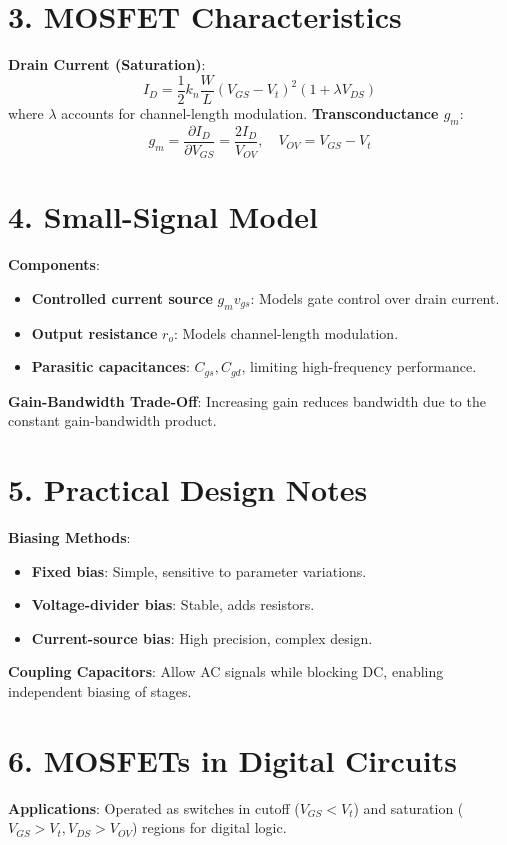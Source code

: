 \documentclass[10pt]{article}
\begin{document}
\begin{multicols}{2}
\section*{3. MOSFET Characteristics}
\textbf{Drain Current (Saturation)}:
\[
I_D = \frac{1}{2} k_n \frac{W}{L} (V_{GS} - V_t)^2 (1 + \lambda V_{DS})
\]
where \(\lambda\) accounts for channel-length modulation.  
\textbf{Transconductance \(g_m\)}:
\[
g_m = \frac{\partial I_D}{\partial V_{GS}} = \frac{2I_D}{V_{OV}}, \quad V_{OV} = V_{GS} - V_t
\]

\section*{4. Small-Signal Model}
\textbf{Components}:
\begin{itemize}[noitemsep]
    \item \textbf{Controlled current source} \(g_m v_{gs}\): Models gate control over drain current.
    \item \textbf{Output resistance} \(r_o\): Models channel-length modulation.
    \item \textbf{Parasitic capacitances}: \(C_{gs}, C_{gd}\), limiting high-frequency performance.
\end{itemize}
\textbf{Gain-Bandwidth Trade-Off}: Increasing gain reduces bandwidth due to the constant gain-bandwidth product.

\section*{5. Practical Design Notes}
\textbf{Biasing Methods}:
\begin{itemize}[noitemsep]
    \item \textbf{Fixed bias}: Simple, sensitive to parameter variations.
    \item \textbf{Voltage-divider bias}: Stable, adds resistors.
    \item \textbf{Current-source bias}: High precision, complex design.
\end{itemize}
\textbf{Coupling Capacitors}: Allow AC signals while blocking DC, enabling independent biasing of stages.

\section*{6. MOSFETs in Digital Circuits}
\textbf{Applications}: Operated as switches in cutoff (\(V_{GS} < V_t\)) and saturation (\(V_{GS} > V_t, V_{DS} > V_{OV}\)) regions for digital logic.


\end{multicols}
\end{document}
